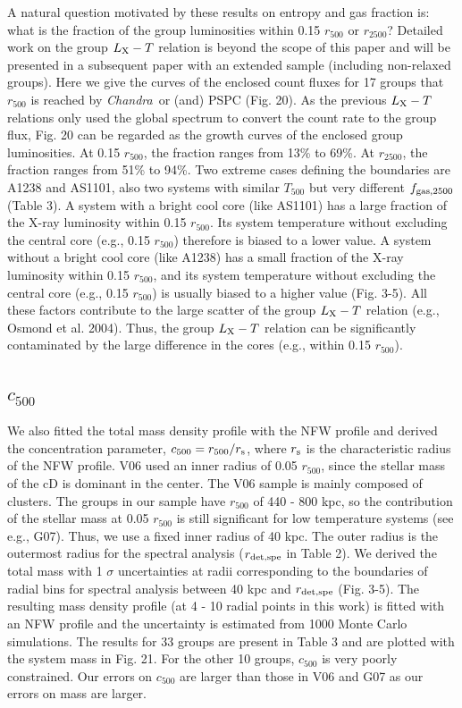 \documentclass{aastex}
\def\chandra    {{\em Chandra}\/}
\begin{document}
A natural question motivated by these results on entropy and gas fraction is:
what is the fraction of the group luminosities within 0.15 $r_{500}$ or $r_{2500}$?
Detailed work on the group $L_{\rm X} - T$ relation is beyond the scope of this paper
and will be presented in a subsequent paper with an extended sample (including
non-relaxed groups). Here we give the curves of the enclosed count fluxes for
17 groups that $r_{500}$ is reached by \chandra\ or (and) PSPC (Fig. 20).
As the previous $L_{\rm X} - T$ relations only used the global spectrum to convert
the count rate to the group flux, Fig. 20 can be regarded as the growth curves of the enclosed
group luminosities. At 0.15 $r_{500}$, the fraction ranges from 13\% to 69\%.
At $r_{2500}$, the fraction ranges from 51\% to 94\%. Two extreme cases defining the
boundaries are A1238 and AS1101, also two systems with similar $T_{500}$ but very
different $f_{\rm gas, 2500}$ (Table 3). A system with a bright cool core (like
AS1101) has a large fraction of the X-ray luminosity within 0.15 $r_{500}$.
Its system temperature without excluding the central core (e.g., 0.15 $r_{500}$)
therefore is biased to a lower value.
A system without a bright cool core (like A1238) has a small fraction of the X-ray
luminosity within 0.15 $r_{500}$, and its system temperature without excluding
the central core (e.g., 0.15 $r_{500}$) is usually biased to a higher value
(Fig. 3-5). All these factors contribute to the large scatter of the group
$L_{\rm X} - T$ relation (e.g., Osmond et al. 2004). Thus,
the group $L_{\rm X} - T$ relation can be significantly contaminated by the large
difference in the cores (e.g., within 0.15 $r_{500}$). 

\subsection{$c_{500}$}

We also fitted the total mass density profile with the NFW profile and derived the concentration
parameter, $c_{500} = r_{500} / r_{\rm s}$, where $r_{\rm s}$ is the characteristic
radius of the NFW profile. V06 used an inner radius of 0.05 $r_{500}$, since the stellar
mass of the cD is dominant in the center. The V06 sample is mainly composed of clusters.
The groups in our sample have $r_{500}$ of 440 - 800 kpc, so the contribution
of the stellar mass at 0.05 $r_{500}$ is still significant for low temperature systems
(see e.g., G07). Thus, we use a fixed inner radius of 40 kpc. The outer radius is
the outermost radius for the spectral analysis ($r_{\rm det, spe}$ in Table 2). 
We derived the total mass with 1 $\sigma$ uncertainties at radii corresponding to
the boundaries of radial bins for spectral analysis between 40 kpc and $r_{\rm det, spe}$
(Fig. 3-5). The resulting mass density profile (at 4 - 10 radial points in this work) is fitted
with an NFW profile and the uncertainty is estimated from 1000 Monte Carlo simulations.
The results for 33 groups are present in Table 3 and are plotted with the system mass in Fig. 21.
For the other 10 groups, $c_{500}$ is very poorly constrained.
Our errors on $c_{500}$ are larger than those in V06 and G07 as our errors on mass
are larger. 
\end{document}

